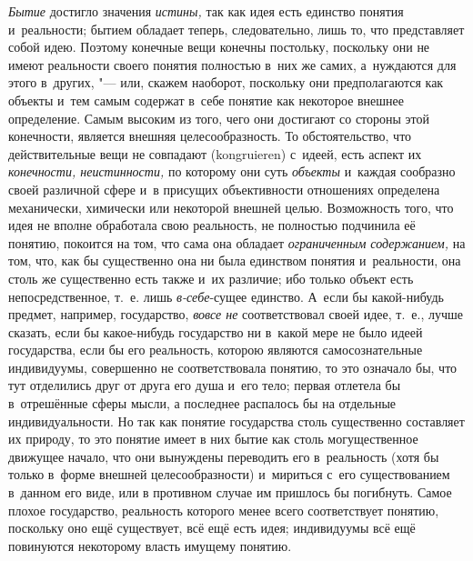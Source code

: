 {\em Бытие} достигло
значения {\em истины,}
так как идея есть единство понятия и~реальности; бытием
обладает теперь, следовательно, лишь то, что представляет собой идею.
Поэтому конечные вещи конечны постольку, поскольку они не имеют реальности
своего понятия полностью в~них же самих, а~нуждаются для этого в~других, "---
или, скажем наоборот, поскольку они предполагаются как
объекты и~тем самым содержат в~себе понятие как некоторое внешнее
определение. Самым высоким из того, чего они достигают со стороны этой
конечности, является внешняя целесообразность. То обстоятельство, что
действительные вещи не совпадают (kongruieren) с~идеей, есть
аспект их {\em конечности,
неистинности,} по которому они суть
{\em объекты} и~каждая
сообразно своей различной сфере и~в присущих объективности отношениях
определена механически, химически или некоторой внешней целью. Возможность
того, что идея не вполне обработала свою реальность, не полностью подчинила
её понятию, покоится на том, что сама она обладает
{\em ограниченным содержанием,}
на том, что, как бы существенно она ни была единством понятия
и~реальности, она столь же существенно есть также и~их различие; ибо
только объект есть непосредственное, т.~е. лишь
{\em в-себе}-сущее
единство. А~если бы какой-нибудь предмет, например, государство,
{\em вовсе не}
соответствовал своей идее, т.~е., лучше сказать, если бы
какое-нибудь государство ни в~какой мере не было идеей государства, если бы
его реальность, которою являются самосознательные индивидуумы, совершенно
не соответствовала понятию, то это означало бы, что тут отделились друг от
друга его душа и~его тело; первая отлетела бы в~отрешённые сферы мысли, а
последнее распалось бы на отдельные индивидуальности. Но так как понятие
государства столь существенно составляет их природу, то это понятие имеет в
них бытие как столь могущественное движущее начало, что они вынуждены
переводить его в~реальность (хотя бы только в~форме внешней
целесообразности) и~мириться с~его существованием в~данном его виде, или в
противном случае им пришлось бы погибнуть. Самое плохое государство,
реальность которого менее всего соответствует понятию, поскольку оно ещё
существует, всё ещё есть идея; индивидуумы всё ещё повинуются некоторому
власть имущему понятию.

